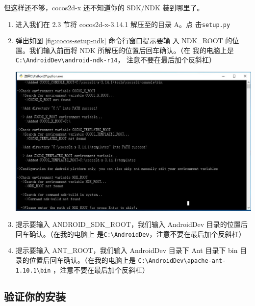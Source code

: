 \documentclass[a4paper, 10pt]{article}
\begin{document}
但这样还不够，cocos2d-x 还不知道你的 SDK/NDK 装到哪里了。

\begin{enumerate}
\item 进入我们在 2.3 节将 cocos2d-x-3.14.1 解压至的目录 A。点
  击\texttt{setup.py}
\item 弹出如图 \ref{fig:cocos-setup-ndk} 命令行窗口提示要输
  入 NDK\_ROOT 的位置。我们输入前面将 NDK 所解压的位置后回车确认。（在
  我的电脑上是
  \texttt{C:\textbackslash{}AndroidDev\textbackslash{}android-ndk-r14}，
  注意不要在最后加个反斜杠）

  \begin{center}
    \includegraphics*[width=.8\textwidth]{images/cocos-setup-ndk}    
  \end{center}
  
\item 提示要输入 ANDROID\_SDK\_ROOT，我们输入 AndroidDev 目录的位置后
  回车确认。（在我的电脑上
  是\texttt{C:\textbackslash{}AndroidDev}，注意不要在最后加个反斜杠）
  
\item 提示要输入 ANT\_ROOT，我们输入 AndroidDev 目录下 Ant 目录下 bin 目
  录的位置后回车确认。（在我的电脑上是
  \texttt{C:\textbackslash{}AndroidDev\textbackslash{}apache-ant-1.10.1\textbackslash{}bin}
  ，注意不要在最后加个反斜杠）

\end{enumerate}


\subsection{验证你的安装}
\end{document}

